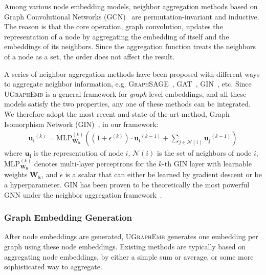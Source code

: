 \documentclass{article}
\newcommand{\model}{\textsc{UGraphEmb}\xspace}
\newcommand{\gcn}{\textsc{GCN}\xspace}
\newcommand{\gin}{\textsc{GIN}\xspace}
\begin{document}
Among various node embedding models, neighbor aggregation methods based on Graph Convolutional Networks (\gcn)~\cite{kipf2016semi} are permutation-invariant
and inductive.
The reason is that the core operation, graph convolution, updates the representation of a node by aggregating the embedding of itself and the embeddings of its neighbors. Since the aggregation function treats the neighbors of a node as a set, the order does not affect the result. 

A series of neighbor aggregation methods have been proposed with different ways to aggregate neighbor information, e.g. \textsc{GraphSAGE}~\cite{hamilton2017inductive}, \textsc{GAT}~\cite{velickovic2017graph}, \gin~\cite{xu2018powerful}, etc. Since \model is a general framework for \textit{graph}-level embeddings, and all these models satisfy the two properties, any one of these methods can be integrated. We therefore adopt the most recent and state-of-the-art method, Graph Isomorphism Network (\gin)~\cite{xu2018powerful}, in our framework: 
\begin{align} \label{GIN-agg}
\bm{u_i}^{(k)} =   \mathrm{MLP}_{\bm{W_{k}}}^{(k)}   \left(  \left( 1 + \epsilon^{(k)} \right) \cdot \bm{u_i}^{(k-1)} +  \sum_{j \in \mathcal{N}(i)} \bm{u_j}^{(k-1)}\right)
\end{align}
where $\bm{u_i}$ is the representation of node $i$, $\mathcal{N}(i)$ is the set of neighbors of node $i$, $\mathrm{MLP}_{\bm{W_{k}}}^{(k)}$ denotes multi-layer perceptrons for the $k$-th \gin layer with learnable weights $\bm{W_{k}}$, and $\epsilon$ is a scalar that can either be learned by gradient descent or be a hyperparameter. \gin has been proven to be theoretically the most powerful GNN under the neighbor aggregation framework~\cite{xu2018powerful}.


\subsubsection{Graph Embedding Generation}

After node embeddings are generated, \model generates one embedding per graph using these node embeddings. Existing methods are typically based on aggregating node embeddings, by either a simple sum or average, or some more sophisticated way to aggregate. 
\end{document}
